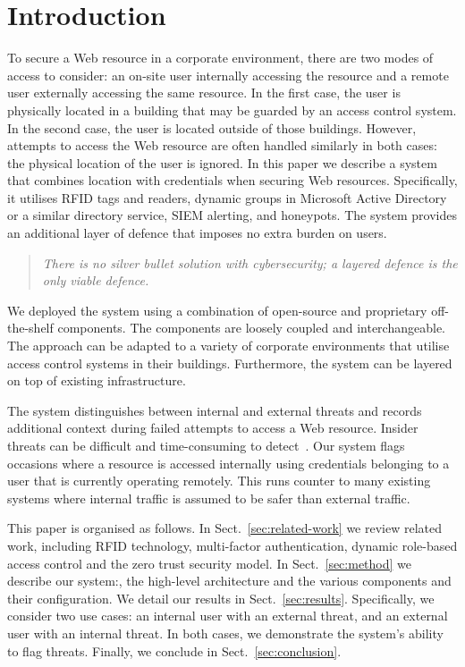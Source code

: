 \section{Introduction}\label{sec:introduction}

To secure a Web resource in a corporate environment, there are two
modes of access to consider: an on-site user internally accessing the
resource and a remote user externally accessing the same resource.  In
the first case, the user is physically located in a building that may
be guarded by an access control system.  In the second case, the user
is located outside of those buildings.  However, attempts to access
the Web resource are often handled similarly in both cases: the
physical location of the user is ignored.  In this paper we describe a
system that combines location with credentials when securing Web
resources.  Specifically, it utilises RFID tags and readers, dynamic
groups in Microsoft Active Directory or a similar directory service,
SIEM alerting, and honeypots.  The system provides an additional layer
of defence that imposes no extra burden on users.

\begin{quote}
  \em{There is no silver bullet solution with cybersecurity; a layered
    defence is the only viable defence.}

\end{quote}

We deployed the system using a combination of open-source and
proprietary off-the-shelf components.  The components are loosely
coupled and interchangeable.  The approach can be adapted to a variety
of corporate environments that utilise access control systems in their
buildings.  Furthermore, the system can be layered on top of existing
infrastructure.

The system distinguishes between internal and external threats and
records additional context during failed attempts to access a Web
resource.  Insider threats can be difficult and time-consuming to
detect~\cite{liu-et-al-18}.  Our system flags occasions where a
resource is accessed internally using credentials belonging to a user
that is currently operating remotely.  This runs counter to many
existing systems where internal traffic is assumed to be safer than
external traffic.

This paper is organised as follows.  In Sect.~\ref{sec:related-work}
we review related work, including RFID technology, multi-factor
authentication, dynamic role-based access control and the zero trust
security model.  In Sect.~\ref{sec:method} we describe our system:,
the high-level architecture and the various components and their
configuration.  We detail our results in Sect.~\ref{sec:results}.
Specifically, we consider two use cases: an internal user with an
external threat, and an external user with an internal threat.  In
both cases, we demonstrate the system's ability to flag threats.
Finally, we conclude in Sect.~\ref{sec:conclusion}.

